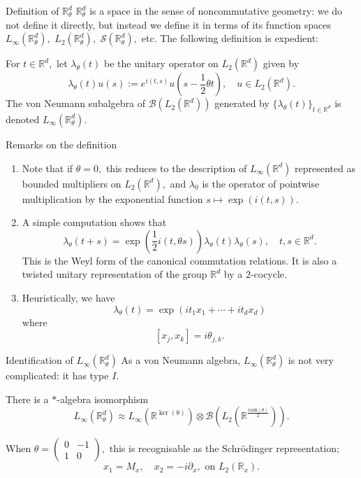 \documentclass{beamer}
\numberwithin{equation}{section}
\theoremstyle{plain}
\theoremstyle{plain}
\theoremstyle{definition}
\theoremstyle{plain}
\theoremstyle{plain}
\theoremstyle{definition}
\newcommand{\Rl}{\mathbb{R}}
\newcommand{\Bc}{\mathcal{B}}
\newcommand{\Sc}{\mathcal{S}}
\begin{document}
\begin{frame}{Definition of $\Rl^d_\theta$}
    $\Rl^d_\theta$ is a space in the sense of noncommutative geometry: we do not define it directly, but instead
    we define it in terms of its function spaces $L_{\infty}(\Rl^d_\theta),$ $L_2(\Rl^d_\theta),$ $\Sc(\Rl^d_\theta),$ etc.\pause
    The following definition is expedient:
    \begin{definition}
        For $t \in \Rl^d,$ let $\lambda_\theta(t)$ be the unitary operator on $L_2(\Rl^d)$ given by
        \[
            \lambda_\theta(t)u(s) := e^{i(t,s)}u(s-\frac12 \theta t),\quad u\in L_2(\Rl^d).
        \]
        The von Neumann subalgebra of $\Bc(L_2(\Rl^d))$ generated by $\{\lambda_\theta(t)\}_{t\in \Rl^d}$ is denoted $L_{\infty}(\Rl^d_\theta).$
    \end{definition}
\end{frame}

\begin{frame}{Remarks on the definition}
    \begin{enumerate}
        \item{} Note that if $\theta=0,$ this reduces to the description of $L_{\infty}(\Rl^d)$ represented as bounded multipliers on $L_2(\Rl^d),$ and $\lambda_0$ is the operator of pointwise multiplication by the exponential function $s\mapsto \exp(i(t,s)).$
        \item{} A simple computation shows that
        \[
            \lambda_\theta(t+s) = \exp(\frac12 i(t,\theta s))\lambda_\theta(t)\lambda_\theta(s),\quad t,s\in \Rl^d.
        \]
        This is the Weyl form of the canonical commutation relations. It is also a twisted unitary representation of the group $\Rl^d$ by a $2$-cocycle.
        \item{} Heuristically, we have
        \[
            \lambda_\theta(t) = \exp(it_1x_1+\cdots+it_dx_d)
        \]
        where
        \[
            [x_j,x_k] = i\theta_{j,k}.
        \]
    \end{enumerate}
\end{frame}

\begin{frame}{Identification of $L_{\infty}(\Rl^d_\theta)$}
    As a von Neumann algebra, $L_{\infty}(\Rl^d_\theta)$ is not very complicated: it has type $I.$
    \begin{theorem}
        There is a $*$-algebra isomorphism
        \[
            L_{\infty}(\Rl^d_\theta) \approx L_{\infty}(\Rl^{\mathrm{\ker(\theta)}})\otimes \Bc(L_2(\Rl^{\frac{\mathrm{rank}(\theta)}{2}})).
        \]
    \end{theorem}
    When $\theta = \begin{pmatrix} 0 & -1 \\ 1 & 0\end{pmatrix},$ this is recognisable as the Schr\"odinger representation;
    \[
        x_1 = M_x,\quad x_2 = -i\partial_x,\text{ on } L_2(\Rl_x).
    \]
\end{frame}
\end{document}

